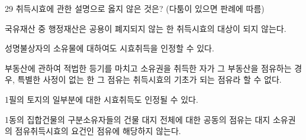 \begin{question}{29}
취득시효에 관한 설명으로 옳지 않은 것은? (다툼이 있으면 판례에 따름)
\begin{choices}
  \item 국유재산 중 행정재산은 공용이 폐지되지 않는 한 취득시효의 대상이 되지 않는다.
  \item 성명불상자의 소유물에 대하여도 시효취득을 인정할 수 있다.
  \item 부동산에 관하여 적법한 등기를 마치고 소유권을 취득한 자가 그 부동산을 점유하는 경우, 특별한 사정이 없는 한 그 점유는 취득시효의 기초가 되는 점유라 할 수 없다.
  \item 1필의 토지의 일부분에 대한 시효취득도 인정될 수 있다.
  \item 1동의 집합건물의 구분소유자들의 건물 대지 전체에 대한 공동의 점유는 대지 소유권의 점유취득시효의 요건인 점유에 해당하지 않는다.
\end{choices}
\end{question}
